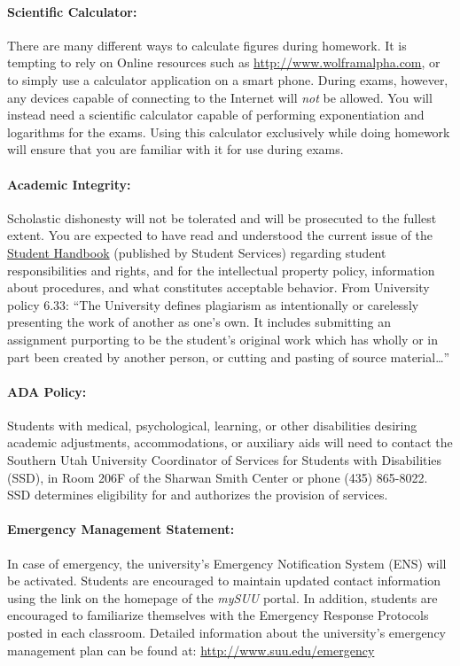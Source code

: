 \documentclass[12pt, letterpaper]{article}
\begin{document}
\paragraph{Scientific Calculator:}
There are many different ways to calculate figures during homework. It is tempting to rely on Online resources such as \href{http://www.wolframalpha.com}{http://www.wolframalpha.com}, or to simply use a calculator application on a smart phone. During exams, however, any devices capable of connecting to the Internet will \emph{not} be allowed. You will instead need a scientific calculator capable of performing exponentiation and logarithms for the exams. Using this calculator exclusively while doing homework will ensure that you are familiar with it for use during exams.

\paragraph{Academic Integrity:}
Scholastic dishonesty will not be tolerated and will be prosecuted to the fullest extent. You are expected to have read and understood the current issue of the \href{https://help.suu.edu/handbook}{Student Handbook} (published by Student Services) regarding student responsibilities and rights, and for the intellectual property policy, information about procedures, and what constitutes acceptable behavior. From University policy 6.33: ``The University defines plagiarism as intentionally or carelessly presenting the work of another as one’s own. It includes submitting an assignment purporting to be the student’s original work which has wholly or in part been created by another person, or cutting and pasting of source material\ldots''

\paragraph{ADA Policy:}
Students with medical, psychological, learning, or other disabilities desiring academic adjustments, accommodations, or auxiliary aids will need to contact the Southern Utah University Coordinator of Services for Students with Disabilities (SSD), in Room 206F of the Sharwan Smith Center or phone (435) 865-8022. SSD determines eligibility for and authorizes the provision of services.

\paragraph{Emergency Management Statement:}
In case of emergency, the university's Emergency Notification System (ENS) will be activated. Students are encouraged to maintain updated contact information using the link on the homepage of the \emph{mySUU} portal. In addition, students are encouraged to familiarize themselves with the Emergency Response Protocols posted in each classroom. Detailed information about the university's emergency management plan can be found at: \href{http://www.suu.edu/emergency}{http://www.suu.edu/emergency}
\end{document}
